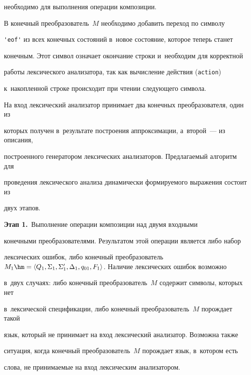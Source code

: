 необходимо для выполнения операции композиции.





В конечный преобразователь~$M$ необходимо добавить переход по символу 


\verb"'eof'" из всех конечных состояний в~новое состояние, которое теперь станет 


конечным. Этот символ означает окончание строки и~необходим для корректной 


работы лексического анализатора, так как вычисление действия (\verb"action") 


к~накопленной строке происходит при чтении следующего символа.





На вход лексический анализатор принимает два конечных преобразователя, один из 


которых получен в~результате построения аппроксимации, а~второй~--- из описания, 


построенного генератором лексических анализаторов. Предлага\-емый алгоритм для 


проведения лексического анализа динамически формируемого выражения состоит из 


двух этапов.





\textbf{Этап 1.}\  Выполнение операции композиции над двумя входными 


конечными преобразователями. Результатом этой операции является либо набор 


лексических ошибок, либо конечный преобразователь $M_1 \hm= \langle Q_1, \Sigma_1, 


\Sigma'_1, \Delta_1, q_{01}, F_1 \rangle$. Наличие лексических ошибок возможно 


в~двух случаях: либо конечный преобразователь~$M$  содержит символы, которых нет 


в~лексической спецификации, либо конечный преобразователь~$M$ порождает такой 


язык, который не принимает на вход лексический анализатор. Возможна также 


ситуация, когда конечный преобразователь~$M$ порождает язык, в~котором есть 


слова, не принимаемые на вход лексическим анализатором.





